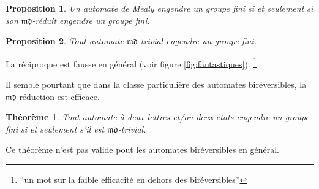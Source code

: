 \documentclass[11pt,a4paper]{article}
\newtheorem{prop}{Proposition}
\newtheorem{thm}{Théorème}
\begin{document}
\begin{prop}
  \label{prop:md-trivial}
  Un automate de Mealy engendre un groupe fini si et seulement si son $\mathfrak{md}$-réduit engendre un groupe fini.
\end{prop}

\begin{prop}
  Tout automate $\mathfrak{md}$-trivial engendre un groupe fini.
\end{prop}

La réciproque est fausse en général (voir figure \ref{fig:fantastiques}). \footnote{``un mot sur la faible efficacité en dehors des biréversibles''}

Il semble pourtant que dans la classe particulière des automates biréversibles, la $\mathfrak{md}$-réduction est efficace.

\begin{thm}{\cite{Klimann13}}
  \label{thm:K}
  Tout automate à deux lettres et/ou deux états engendre un groupe fini si et seulement s'il est $\mathfrak{md}$-trivial.
\end{thm}

Ce théorème n'est pas valide pout les automates biréversibles en général.
\end{document}
